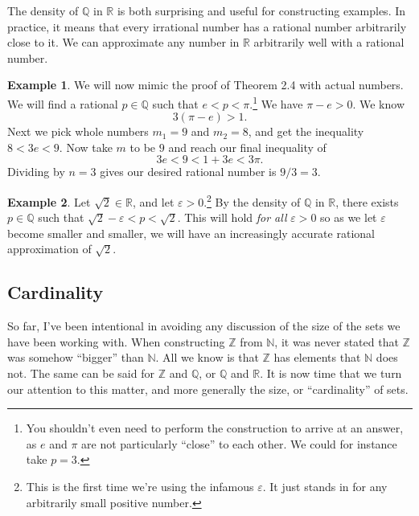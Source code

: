 \documentclass{article}
\newcommand{\N}{\mathbb{N}}
\newcommand{\R}{\mathbb{R}}
\newcommand{\Q}{\mathbb{Q}}
\newcommand{\Z}{\mathbb{Z}}
\theoremstyle{definition}
\newtheorem{example}{Example}[section]
\begin{document}
	The density of $ \Q $ in $ \R $ is both surprising and useful for constructing examples. In practice, it means that every irrational number has a rational number arbitrarily close to it. We can approximate any number in $ \R $ arbitrarily well with a rational number.
	\begin{example}
		We will now mimic the proof of Theorem 2.4 with actual numbers. We will find a rational $ p\in\Q $ such that $ e<p<\pi $.\footnote{You shouldn't even need to perform the construction to arrive at an answer, as $ e $ and $ \pi $ are not particularly ``close'' to each other. We could for instance take $ p=3 $. } We have $ \pi-e>0 $. We know $$ 3(\pi-e)>1 .$$ Next we pick whole numbers $ m_1=9 $ and $ m_2=8 $, and get the inequality $ 8<3e<9 $. Now take $ m $ to be $ 9 $ and reach our final inequality of $$ 3e<9<1+3e <3\pi.$$ Dividing by $ n=3 $ gives our desired rational number is $ 9/3=3 $.  
	\end{example}
	\begin{example}
		Let $ \sqrt{2}\in\R $, and let $ \varepsilon>0 $.\footnote{This is the first time we're using the infamous $ \varepsilon $. It just stands in for any arbitrarily small positive number.} By the density of $ \Q $ in $ \R $, there exists $ p\in\Q $ such that $ \sqrt{2}-\varepsilon<p<\sqrt{2} $. This will hold \textit{for all} $ \varepsilon>0 $ so as we let $ \varepsilon $ become smaller and smaller, we will have an increasingly accurate rational approximation of $ \sqrt{2} $.
	\end{example}     
	\subsection{Cardinality}
	So far, I've been intentional in avoiding any discussion of the size of the sets we have been working with. When constructing $ \Z $ from $ \N $, it was never stated that $ \Z $ was somehow ``bigger'' than $ \N $. All we know is that $ \Z $ has elements that $ \N $ does not. The same can be said for $ \Z $ and $ \Q $, or $ \Q $ and $ \R $. It is now time that we turn our attention to this matter, and more generally the size, or ``cardinality'' of sets. 
	
\end{document}
